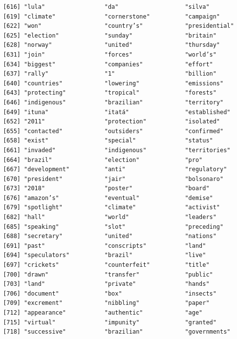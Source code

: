 \documentclass[
  letterpaper,
  DIV=11,
  numbers=noendperiod]{scrartcl}
\begin{document}
\begin{verbatim}
 [616] "lula"                 "da"                   "silva"               
 [619] "climate"              "cornerstone"          "campaign"            
 [622] "won"                  "country’s"            "presidential"        
 [625] "election"             "sunday"               "britain"             
 [628] "norway"               "united"               "thursday"            
 [631] "join"                 "forces"               "world’s"             
 [634] "biggest"              "companies"            "effort"              
 [637] "rally"                "1"                    "billion"             
 [640] "countries"            "lowering"             "emissions"           
 [643] "protecting"           "tropical"             "forests"             
 [646] "indigenous"           "brazilian"            "territory"           
 [649] "ituna"                "itatá"                "established"         
 [652] "2011"                 "protection"           "isolated"            
 [655] "contacted"            "outsiders"            "confirmed"           
 [658] "exist"                "special"              "status"              
 [661] "invaded"              "indigenous"           "territories"         
 [664] "brazil"               "election"             "pro"                 
 [667] "development"          "anti"                 "regulatory"          
 [670] "president"            "jair"                 "bolsonaro"           
 [673] "2018"                 "poster"               "board"               
 [676] "amazon’s"             "eventual"             "demise"              
 [679] "spotlight"            "climate"              "activist"            
 [682] "hall"                 "world"                "leaders"             
 [685] "speaking"             "slot"                 "preceding"           
 [688] "secretary"            "united"               "nations"             
 [691] "past"                 "conscripts"           "land"                
 [694] "speculators"          "brazil"               "live"                
 [697] "crickets"             "counterfeit"          "title"               
 [700] "drawn"                "transfer"             "public"              
 [703] "land"                 "private"              "hands"               
 [706] "document"             "box"                  "insects"             
 [709] "excrement"            "nibbling"             "paper"               
 [712] "appearance"           "authentic"            "age"                 
 [715] "virtual"              "impunity"             "granted"             
 [718] "successive"           "brazilian"            "governments"         

\end{verbatim}
\end{document}
